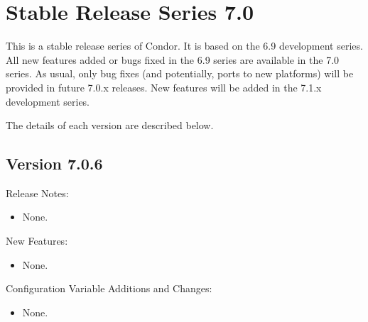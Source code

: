 
\section{\label{sec:History-7-0}Stable Release Series 7.0}

This is a stable release series of Condor.
It is based on the 6.9 development series.
All new features added or bugs fixed in the 6.9 series are available
in the 7.0 series.
As usual, only bug fixes (and potentially, ports to new platforms)
will be provided in future 7.0.x releases.
New features will be added in the 7.1.x development series.

The details of each version are described below.


\subsection*{\label{sec:New-7-0-6}Version 7.0.6}

\noindent Release Notes:

\begin{itemize}

\item None.

\end{itemize}


\noindent New Features:

\begin{itemize}

\item None.

\end{itemize}

\noindent Configuration Variable Additions and Changes:

\begin{itemize}

\item None.

\end{itemize}

